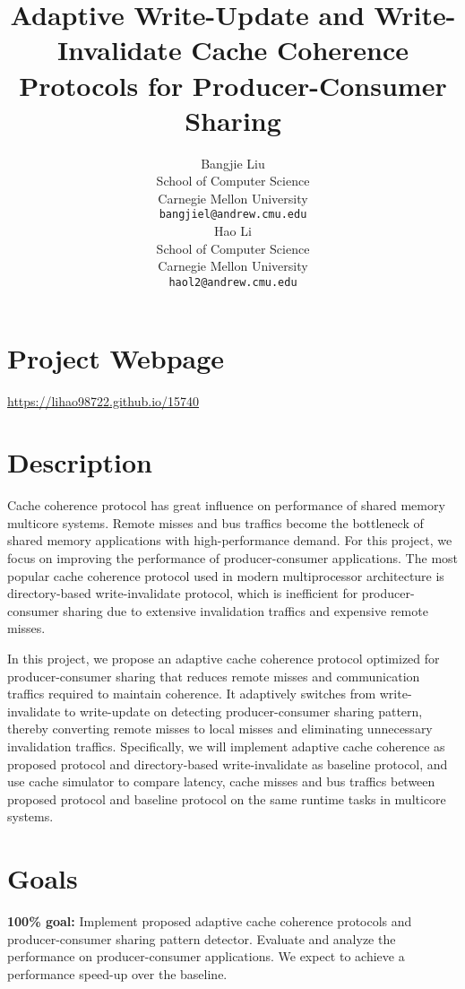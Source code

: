 \documentclass{article} %
\title{Adaptive Write-Update and Write-Invalidate Cache Coherence Protocols for Producer-Consumer Sharing}
\author{
Bangjie Liu \\
School of Computer Science \\
Carnegie Mellon University \\
\texttt{bangjiel@andrew.cmu.edu} \\
\And
Hao Li \\
School of Computer Science \\
Carnegie Mellon University \\
\texttt{haol2@andrew.cmu.edu} \\
}
\begin{document}
\maketitle

\section{Project Webpage}
\begin{center}
   \url{https://lihao98722.github.io/15740}
\end{center}


\section{Description}

Cache coherence protocol has great influence on performance of shared memory multicore systems. Remote misses and bus traffics become the bottleneck of shared memory applications with high-performance demand. For this project, we focus on improving the performance of producer-consumer applications. The most popular cache coherence protocol used in modern multiprocessor architecture is directory-based write-invalidate protocol, which is inefficient for producer-consumer sharing due to extensive invalidation traffics and expensive remote misses.

In this project, we propose an adaptive cache coherence protocol optimized for producer-consumer sharing that reduces remote misses and communication traffics required to maintain coherence. It adaptively switches from write-invalidate to write-update on detecting producer-consumer sharing pattern, thereby converting remote misses to local misses and eliminating unnecessary invalidation traffics. Specifically, we will implement adaptive cache coherence as proposed protocol and directory-based write-invalidate as baseline protocol, and use cache simulator to compare latency, cache misses and bus traffics between proposed protocol and baseline protocol on the same runtime tasks in multicore systems.


\section{Goals}

\textbf{100\% goal:} Implement proposed adaptive cache coherence protocols and producer-consumer sharing pattern detector. Evaluate and analyze the performance on producer-consumer applications. We expect to achieve a performance speed-up over the baseline.
\end{document}
